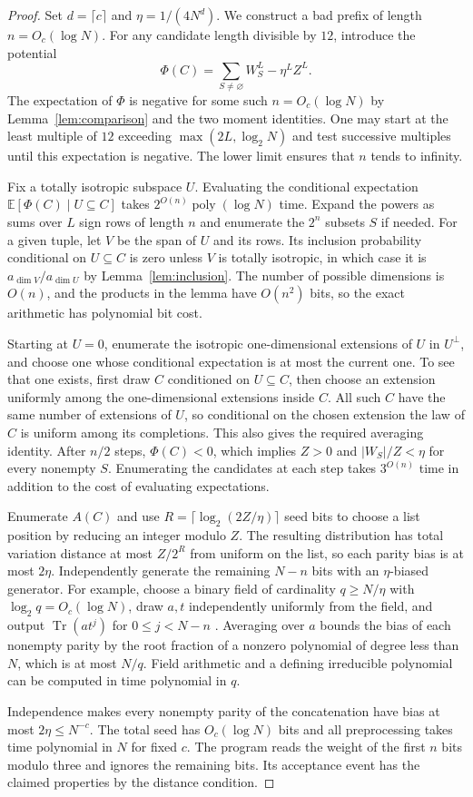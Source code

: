 \documentclass[11pt]{article}
\newcommand{\E}{\mathbb E}
\begin{document}
\begin{proof}
Set $d=\lceil c\rceil$ and $\eta=1/(4N^d)$. We construct a bad prefix
of length $n=O_c(\log N)$. For any candidate length divisible by $12$,
introduce the potential
\[
 \Phi(C)=\sum_{S\ne\varnothing}W_S^L-\eta^L Z^L.
\]
The expectation of $\Phi$ is negative for some such
$n=O_c(\log N)$ by Lemma~\ref{lem:comparison} and the two moment
identities. One may start at the least multiple of $12$ exceeding
$\max(2L,\log_2 N)$ and test successive multiples until this
expectation is negative. The lower limit ensures that $n$ tends to infinity.

Fix a totally isotropic subspace $U$. Evaluating the conditional expectation
$\E[\Phi(C)\mid U\subseteq C]$ takes $2^{O(n)}\operatorname{poly}(\log N)$
time. Expand the powers as sums over $L$ sign rows of length $n$ and
enumerate the $2^n$ subsets $S$ if needed. For a given tuple, let $V$
be the span of $U$ and its rows. Its inclusion probability conditional
on $U\subseteq C$ is zero unless $V$ is totally isotropic, in which case
it is $a_{\dim V}/a_{\dim U}$ by Lemma~\ref{lem:inclusion}.
The number of possible dimensions is $O(n)$, and the products in the
lemma have $O(n^2)$ bits, so the exact arithmetic has polynomial bit cost.

Starting at $U=0$, enumerate the isotropic one-dimensional extensions
of $U$ in $U^\perp$, and choose one whose conditional expectation is
at most the current one. To see that one exists, first draw $C$
conditioned on $U\subseteq C$, then choose an extension uniformly
among the one-dimensional extensions inside $C$. All such $C$ have
the same number of extensions of $U$, so conditional on the chosen
extension the law of $C$ is uniform among its completions. This
also gives the required averaging identity. After $n/2$ steps,
$\Phi(C)<0$, which implies $Z>0$ and $|W_S|/Z<\eta$ for every
nonempty $S$. Enumerating the candidates at each step takes
$3^{O(n)}$ time in addition to the cost of evaluating expectations.

Enumerate $A(C)$ and use $R=\lceil\log_2(2Z/\eta)\rceil$ seed bits to
choose a list position by reducing an integer modulo $Z$. The resulting
distribution has total variation distance at most $Z/2^R$ from uniform
on the list, so each parity bias is at most $2\eta$. Independently
generate the remaining $N-n$ bits with an $\eta$-biased generator. For
example, choose a binary field of cardinality $q\ge N/\eta$ with
$\log_2 q=O_c(\log N)$, draw $a,t$ independently uniformly from the
field, and output $\operatorname{Tr}(a t^j)$ for $0\le j<N-n$
\cite{AGHP}. Averaging over $a$ bounds the bias of each nonempty parity
by the root fraction of a nonzero polynomial of degree less than $N$,
which is at most $N/q$. Field arithmetic and a defining irreducible
polynomial can be computed in time polynomial in $q$.

Independence makes every nonempty parity of the concatenation have
bias at most $2\eta\le N^{-c}$. The total seed has $O_c(\log N)$ bits
and all preprocessing takes time polynomial in $N$ for fixed $c$. The
program reads the weight of the first $n$ bits modulo three and ignores
the remaining bits. Its acceptance event has the claimed properties
by the distance condition.
\end{proof}
\end{document}
